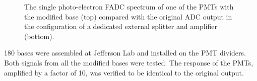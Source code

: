 \begin{figure}
	\caption{The single photo-electron FADC spectrum of one of the PMTs with the modified base (top) compared with the original ADC output in the
            configuration of a dedicated external splitter and amplifier (bottom). }
	\label{fig:dividerTests}
\end{figure}

180 bases were assembled at Jefferson Lab and installed on the PMT dividers. Both signals from all the modified bases were tested.
The response of the PMTs, amplified by a factor of 10, was verified to be identical to the original output.


